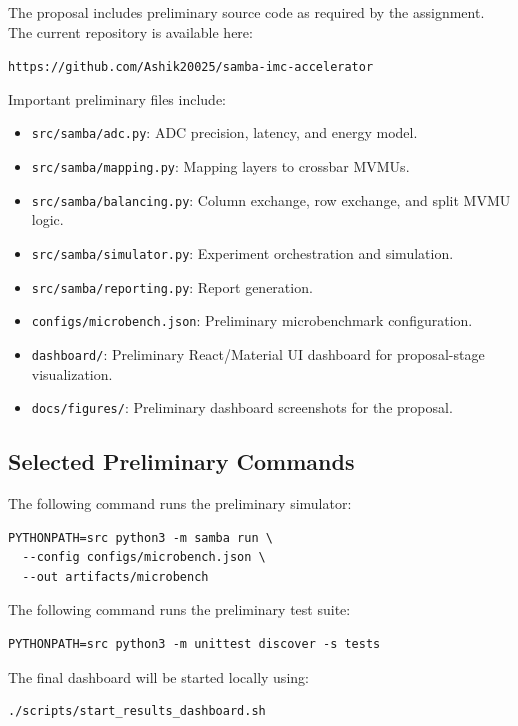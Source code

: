 \documentclass[11pt]{article}
\begin{document}
The proposal includes preliminary source code as required by the assignment. The current repository is available here:

\begin{center}
\texttt{https://github.com/Ashik20025/samba-imc-accelerator}
\end{center}

Important preliminary files include:

\begin{itemize}
    \item \texttt{src/samba/adc.py}: ADC precision, latency, and energy model.
    \item \texttt{src/samba/mapping.py}: Mapping layers to crossbar MVMUs.
    \item \texttt{src/samba/balancing.py}: Column exchange, row exchange, and split MVMU logic.
    \item \texttt{src/samba/simulator.py}: Experiment orchestration and simulation.
    \item \texttt{src/samba/reporting.py}: Report generation.
    \item \texttt{configs/microbench.json}: Preliminary microbenchmark configuration.
    \item \texttt{dashboard/}: Preliminary React/Material UI dashboard for proposal-stage visualization.
    \item \texttt{docs/figures/}: Preliminary dashboard screenshots for the proposal.
\end{itemize}

\subsection{Selected Preliminary Commands}

The following command runs the preliminary simulator:

\begin{lstlisting}
PYTHONPATH=src python3 -m samba run \
  --config configs/microbench.json \
  --out artifacts/microbench
\end{lstlisting}

The following command runs the preliminary test suite:

\begin{lstlisting}
PYTHONPATH=src python3 -m unittest discover -s tests
\end{lstlisting}

The final dashboard will be started locally using:

\begin{lstlisting}
./scripts/start_results_dashboard.sh
\end{lstlisting}
\end{document}
